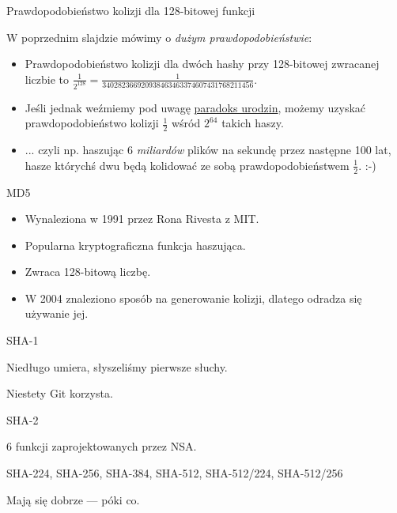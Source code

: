\begin{frame}{Prawdopodobieństwo kolizji dla 128-bitowej funkcji}
	
	W poprzednim slajdzie mówimy o \emph{dużym prawdopodobieństwie}:

	\begin{itemize}
		\item Prawdopodobieństwo kolizji dla dwóch hashy przy 128-bitowej zwracanej liczbie to $\frac{1}{2^{128}}=\frac{1}{340282366920938463463374607431768211456}$.
		
		\item Jeśli jednak weźmiemy pod uwagę \href{http://en.wikipedia.org/wiki/Birthday_problem}{paradoks urodzin}, możemy uzyskać prawdopodobieństwo kolizji $\frac{1}{2}$ wśród $2^{64}$ takich haszy.
		
		\item ... czyli np. haszując 6 \emph{miliardów} plików na sekundę przez następne 100 lat, hasze którychś dwu będą kolidować ze sobą prawdopodobieństwem $\frac{1}{2}$. :-)
	\end{itemize}	
	
\end{frame}

\begin{frame}{MD5}
	\begin{itemize}
		\item Wynaleziona w 1991 przez Rona Rivesta z MIT.
		\item Popularna kryptograficzna funkcja haszująca.
		\item Zwraca 128-bitową liczbę.
		\item W 2004 znaleziono sposób na generowanie kolizji, dlatego odradza się używanie jej.
	\end{itemize}
\end{frame}

\begin{frame}{SHA-1}
	
	Niedługo umiera, słyszeliśmy pierwsze słuchy.
	
	Niestety Git korzysta.
	
\end{frame}

\begin{frame}{SHA-2}
	
	6 funkcji zaprojektowanych przez NSA.
	
	SHA-224, SHA-256, SHA-384, SHA-512, SHA-512/224, SHA-512/256
	
	Mają się dobrze --- póki co.
	
\end{frame}

